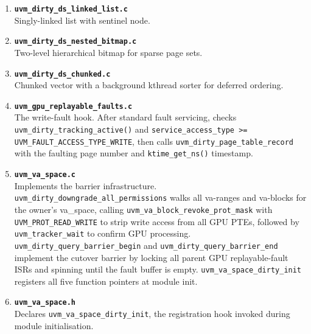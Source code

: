 \begin{enumerate}
    \item \textbf{\texttt{uvm\_dirty\_ds\_linked\_list.c}}\\
          Singly-linked list with sentinel node.\\

    \item \textbf{\texttt{uvm\_dirty\_ds\_nested\_bitmap.c}}\\
          Two-level hierarchical bitmap
          for sparse page sets.\\

    \item \textbf{\texttt{uvm\_dirty\_ds\_chunked.c}}\\
          Chunked vector with a background
          kthread sorter for deferred ordering.\\

    \item \textbf{\texttt{uvm\_gpu\_replayable\_faults.c}}\\
          The write-fault hook.
          After standard fault servicing, checks \texttt{uvm\_dirty\_tracking\_active()}
          and \texttt{service\_access\_type >= UVM\_FAULT\_ACCESS\_TYPE\_WRITE}, then
          calls \texttt{uvm\_dirty\_page\_table\_record} with the faulting page number
          and \texttt{ktime\_get\_ns()} timestamp.\\

    \item \textbf{\texttt{uvm\_va\_space.c}}\\
          Implements the barrier infrastructure.
          \texttt{uvm\_dirty\_downgrade\_all\_permissions} walks all va-ranges and
          va-blocks for the owner's va\_space, calling
          \texttt{uvm\_va\_block\_revoke\_prot\_mask} with \texttt{UVM\_PROT\_READ\_WRITE}
          to strip write access from all GPU PTEs, followed by \texttt{uvm\_tracker\_wait}
          to confirm GPU processing.
          \texttt{uvm\_dirty\_query\_barrier\_begin} and
          \texttt{uvm\_dirty\_query\_barrier\_end} implement the cutover barrier by
          locking all parent GPU replayable-fault ISRs and spinning until the fault
          buffer is empty.
          \texttt{uvm\_va\_space\_dirty\_init} registers all five function pointers
          at module init.\\

    \item \textbf{\texttt{uvm\_va\_space.h}}\\
          Declares \texttt{uvm\_va\_space\_dirty\_init},
          the registration hook invoked during module initialisation.\\


\end{enumerate}
